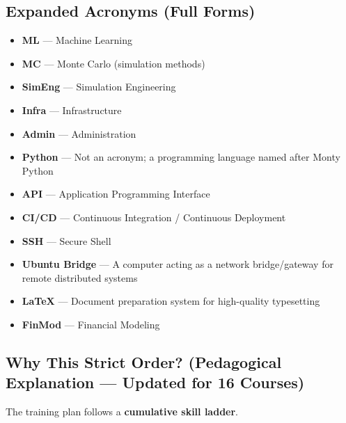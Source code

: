 \documentclass[12pt]{article}
\begin{document}
	\subsection*{Expanded Acronyms (Full Forms)}
	\begin{itemize}
		\item \textbf{ML} — Machine Learning
		\item \textbf{MC} — Monte Carlo (simulation methods)
		\item \textbf{SimEng} — Simulation Engineering
		\item \textbf{Infra} — Infrastructure
		\item \textbf{Admin} — Administration
		\item \textbf{Python} — Not an acronym; a programming language named after Monty Python
		\item \textbf{API} — Application Programming Interface
		\item \textbf{CI/CD} — Continuous Integration / Continuous Deployment
		\item \textbf{SSH} — Secure Shell
		\item \textbf{Ubuntu Bridge} — A computer acting as a network bridge/gateway for remote distributed systems
		\item \textbf{LaTeX} — Document preparation system for high-quality typesetting
		\item \textbf{FinMod} — Financial Modeling
	\end{itemize}
	
	\subsection*{Why This Strict Order? (Pedagogical Explanation — Updated for 16 Courses)}
	
	The training plan follows a \textbf{cumulative skill ladder}.
	
\end{document}

